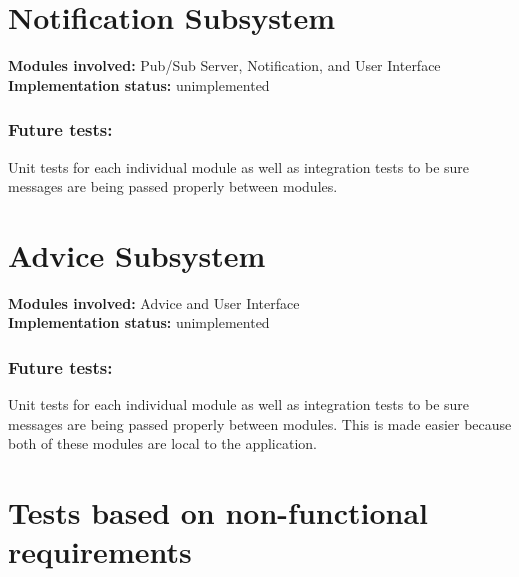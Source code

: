 \documentclass[12pt]{article}
\begin{document}
{	\section{Notification Subsystem }
	\textbf{Modules involved:} Pub/Sub Server, Notification, and User Interface \\
	\textbf{Implementation status:} unimplemented \\
	\subsubsection{Future tests:}
	Unit tests for each individual module as well as integration tests to be sure messages are being passed properly between modules. 

	\section{Advice Subsystem}
	\textbf{Modules involved:} Advice and User Interface \\
	\textbf{Implementation status:} unimplemented \\
	\subsubsection{Future tests:}
	Unit tests for each individual module as well as integration tests to be sure messages are being passed properly between modules. This is made easier because both of these modules are local to the application. 

	\section{Tests based on non-functional requirements}
}
\end{document}
